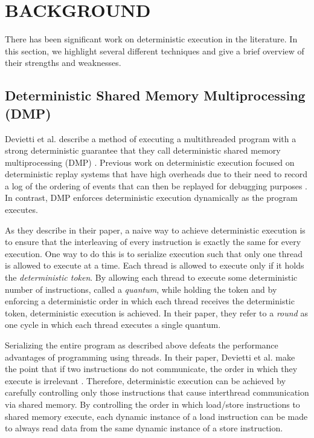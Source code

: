 \chapter{BACKGROUND}
\label{BACKGROUND}

There has been significant work on deterministic execution in the
literature.  In this section, we highlight several different
techniques and give a brief overview of their strengths and
weaknesses.

\section{Deterministic Shared Memory Multiprocessing (DMP)}

Devietti et al. describe a method of executing a multithreaded program
with a strong deterministic guarantee that they call deterministic
shared memory multiprocessing (DMP) \cite{dmp}.  Previous work on
deterministic execution focused on deterministic replay systems that
have high overheads due to their need to record a log of the ordering
of events that can then be replayed for debugging purposes
\cite{recplay}.  In contrast, DMP enforces deterministic execution
dynamically as the program executes.

As they describe in their paper, a naive way to achieve deterministic
execution is to ensure that the interleaving of every instruction is
exactly the same for every execution.  One way to do this is to
serialize execution such that only one thread is allowed to execute at
a time.  Each thread is allowed to execute only if it holds the
\emph{deterministic token}.  By allowing each thread to execute some
deterministic number of instructions, called a \emph{quantum}, while
holding the token and by enforcing a deterministic order in which each
thread receives the deterministic token, deterministic execution is
achieved.  In their paper, they refer to a \emph{round} as one cycle
in which each thread executes a single quantum.

Serializing the entire program as described above defeats the
performance advantages of programming using threads.  In their paper,
Devietti et al. make the point that if two instructions do not
communicate, the order in which they execute is irrelevant \cite{dmp}.
Therefore, deterministic execution can be achieved by carefully
controlling only those instructions that cause interthread
communication via shared memory.  By controlling the order in which
load/store instructions to shared memory execute, each dynamic
instance of a load instruction can be made to always read data from
the same dynamic instance of a store instruction.

